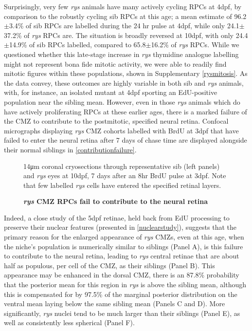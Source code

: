 Surprisingly, very few \textit{rys} animals have many actively cycling RPCs at 4dpf, by comparison to the robustly cycling sib RPCs at this age; a mean estimate of 96.2$\pm$3.4\% of sib RPCs are labelled during the 24 hr pulse at 4dpf, while only 24.1$\pm$37.2\% of \textit{rys} RPCs are. The situation is broadly reversed at 10dpf, with only 24.4$\pm$14.9\% of sib RPCs labelled, compared to 65.8$\pm$16.2\% of \textit{rys} RPCs. While we questioned whether this late-stage increase in \textit{rys} thymidine analogue labelling might not represent bona fide mitotic activity, we were able to readily find mitotic figures within these populations, shown in Supplementary \autoref{rysmitosis}. As the data convey, these outcomes are highly variable in both sib and \textit{rys} animals, with, for instance, an isolated mutant at 4dpf sporting an EdU-positive population near the sibling mean. However, even in those \textit{rys} animals which do have actively proliferating RPCs at these earlier ages, there is a marked failure of the CMZ to contribute to the postmitotic, specified neural retina. Confocal micrographs displaying \textit{rys} CMZ cohorts labelled with BrdU at 3dpf that have failed to enter the neural retina after 7 days of chase time are displayed alongside their normal siblings in \autoref{contributionfailure}. 

\begin{figure}[!h]
    \caption{{\bf \textit{rys} CMZ RPCs fail to contribute to the neural retina}}
    14\si{\micro\metre} coronal cryosections through representative sib (left panels) and \textit{rys} eyes at 10dpf, 7 days after an 8hr BrdU pulse at 3dpf. Note that few labelled \textit{rys} cells have entered the specified retinal layers.
    \label{contributionfailure}
\end{figure}
\FloatBarrier

Indeed, a close study of the 5dpf retinae, held back from EdU processing to preserve their nuclear features (presented in \autoref{nuclearstudy}), suggests that the primary reason for the enlarged appearance of \textit{rys} CMZs, even at this age, when the niche's population is numerically similar to siblings (Panel A), is this failure to contribute to the neural retina, leading to \textit{rys} central retinae that are about half as populous, per cell of the CMZ, as their siblings (Panel B). This appearance may be enhanced in the dorsal CMZ, there is an  87.8\% probability that the posterior mean for this region in \textit{rys} is above the sibling mean, although this is compensated for by 97.5\% of the marginal posterior distribution on the ventral mean laying below the same sibling mean (Panels C and D). More significantly, \textit{rys} nuclei tend to be much larger than their siblings (Panel E), as well as consistently less spherical (Panel F).

